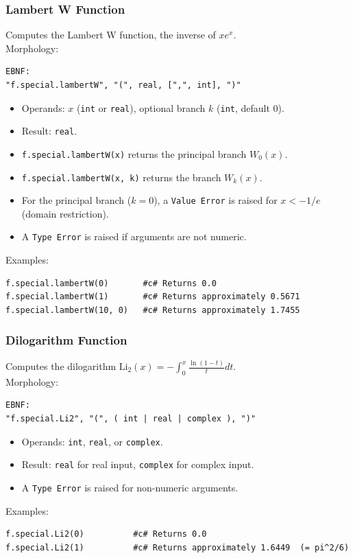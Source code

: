 \subsubsection{Lambert W Function}
Computes the Lambert W function, the inverse of $x e^x$. \\
Morphology:
\begin{verbatim}
EBNF:
"f.special.lambertW", "(", real, [",", int], ")"
\end{verbatim}
\begin{itemize}
\item Operands: $x$ (\texttt{int} or \texttt{real}), optional branch $k$ (\texttt{int}, default 0).
\item Result: \texttt{real}.
\item \texttt{f.special.lambertW(x)} returns the principal branch $W_0(x)$.
\item \texttt{f.special.lambertW(x, k)} returns the branch $W_k(x)$.
\item For the principal branch ($k = 0$), a \texttt{Value Error} is raised for $x < -1/e$ (domain restriction).
\item A \texttt{Type Error} is raised if arguments are not numeric.
\end{itemize}
Examples:
\begin{verbatim}
f.special.lambertW(0)       #c# Returns 0.0
f.special.lambertW(1)       #c# Returns approximately 0.5671
f.special.lambertW(10, 0)   #c# Returns approximately 1.7455
\end{verbatim}

\subsubsection{Dilogarithm Function}
Computes the dilogarithm $\text{Li}_2(x) = -\int_0^x \frac{\ln(1-t)}{t} dt$. \\
Morphology:
\begin{verbatim}
EBNF:
"f.special.Li2", "(", ( int | real | complex ), ")"
\end{verbatim}
\begin{itemize}
\item Operands: \texttt{int}, \texttt{real}, or \texttt{complex}.
\item Result: \texttt{real} for real input, \texttt{complex} for complex input.
\item A \texttt{Type Error} is raised for non-numeric arguments.
\end{itemize}
Examples:
\begin{verbatim}
f.special.Li2(0)          #c# Returns 0.0
f.special.Li2(1)          #c# Returns approximately 1.6449  (= pi^2/6)
\end{verbatim}

